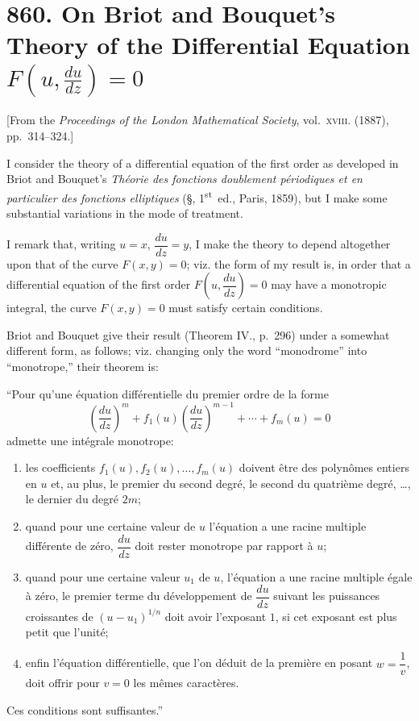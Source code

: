 \documentclass[11pt,a4paper]{article}
\theoremstyle{definition}
\begin{document}
\section*{860. On Briot and Bouquet's Theory of the Differential Equation $F(u, \frac{du}{dz}) = 0$}

\begin{center}
[From the \textit{Proceedings of the London Mathematical Society}, vol.~\textsc{xviii}. (1887), pp.~314--324.]
\end{center}

I consider the theory of a differential equation of the first order as developed in Briot and Bouquet's \textit{Th\'eorie des fonctions doublement p\'eriodiques et en particulier des fonctions elliptiques} (\S, 1\textsuperscript{st}~ed., Paris, 1859), but I make some substantial variations in the mode of treatment.

I remark that, writing $u = x$, $\dfrac{du}{dz} = y$, I make the theory to depend altogether upon that of the curve $F(x, y) = 0$; viz. the form of my result is, in order that a differential equation of the first order $F\!\left(u, \dfrac{du}{dz}\right) = 0$ may have a monotropic integral, the curve $F(x, y) = 0$ must satisfy certain conditions.

Briot and Bouquet give their result (Theorem IV., p.~296) under a somewhat different form, as follows; viz. changing only the word ``monodrome'' into ``monotrope,'' their theorem is:

``Pour qu'une \'equation diff\'erentielle du premier ordre de la forme
\[
\left(\frac{du}{dz}\right)^m + f_1(u)\left(\frac{du}{dz}\right)^{m-1} + \cdots + f_m(u) = 0
\]
admette une int\'egrale monotrope:
\begin{enumerate}[label=\arabic*.]
\item les coefficients $f_1(u), f_2(u), \ldots, f_m(u)$ doivent \^etre des polyn\^omes entiers en $u$ et, au plus, le premier du second degr\'e, le second du quatri\`eme degr\'e, \ldots, le dernier du degr\'e $2m$;
\item quand pour une certaine valeur de $u$ l'\'equation a une racine multiple diff\'erente de z\'ero, $\dfrac{du}{dz}$ doit rester monotrope par rapport \`a $u$;
\item quand pour une certaine valeur $u_1$ de $u$, l'\'equation a une racine multiple \'egale \`a z\'ero, le premier terme du d\'eveloppement de $\dfrac{du}{dz}$ suivant les puissances croissantes de $(u - u_1)^{1/n}$ doit avoir l'exposant $1$, si cet exposant est plus petit que l'unit\'e;
\item enfin l'\'equation diff\'erentielle, que l'on d\'eduit de la premi\`ere en posant $w = \dfrac{1}{v}$, doit offrir pour $v = 0$ les m\^emes caract\`eres.
\end{enumerate}
Ces conditions sont suffisantes.''
\end{document}
